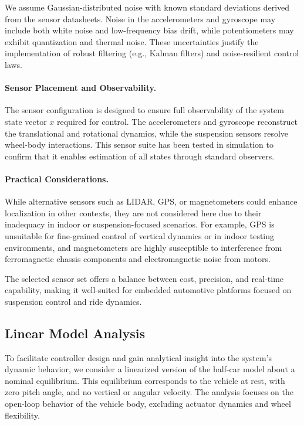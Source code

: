 \documentclass[]{report}
\begin{document}
We assume Gaussian-distributed noise with known standard deviations derived from the sensor datasheets. Noise in the accelerometers and gyroscope may include both white noise and low-frequency bias drift, while potentiometers may exhibit quantization and thermal noise. These uncertainties justify the implementation of robust filtering (e.g., Kalman filters) and noise-resilient control laws.

\paragraph{Sensor Placement and Observability.}
The sensor configuration is designed to ensure full observability of the system state vector $x$ required for control. The accelerometers and gyroscope reconstruct the translational and rotational dynamics, while the suspension sensors resolve wheel-body interactions. This sensor suite has been tested in simulation to confirm that it enables estimation of all states through standard observers.

\paragraph{Practical Considerations.}
While alternative sensors such as LIDAR, GPS, or magnetometers could enhance localization in other contexts, they are not considered here due to their inadequacy in indoor or suspension-focused scenarios. For example, GPS is unsuitable for fine-grained control of vertical dynamics or in indoor testing environments, and magnetometers are highly susceptible to interference from ferromagnetic chassis components and electromagnetic noise from motors.

The selected sensor set offers a balance between cost, precision, and real-time capability, making it well-suited for embedded automotive platforms focused on suspension control and ride dynamics.

\subsection{Linear Model Analysis}

To facilitate controller design and gain analytical insight into the system's dynamic behavior, we consider a linearized version of the half-car model about a nominal equilibrium. This equilibrium corresponds to the vehicle at rest, with zero pitch angle, and no vertical or angular velocity. The analysis focuses on the open-loop behavior of the vehicle body, excluding actuator dynamics and wheel flexibility.
\end{document}
